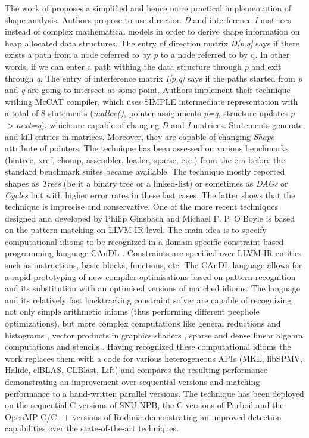\quad The work of \cite{Ghiya:1996:TDC:237721.237724} proposes a simplified and hence more practical implementation of shape analysis. Authors propose to use direction \textit{D} and interference \textit{I} matrices instead of complex mathematical models in order to derive shape information on heap allocated data structures. The entry of direction matrix \textit{D[p,q]} says if there exists a path from a node referred to by \textit{p} to a node referred to by q. In other words, if we can enter a path withing the data structure through \textit{p} and exit through \textit{q}. The entry of interference matrix \textit{I[p,q]} says if the paths started from \textit{p} and \textit{q} are going to intersect at some point. Authors implement their technique withing McCAT compiler, which uses SIMPLE intermediate representation with a total of 8 statements (\textit{malloc()}, pointer assignments \textit{p=q}, structure updates \textit{p-$>$next=q}), which are capable of changing \textit{D} and \textit{I} matrices. Statements generate and kill entries in matrices. Moreover, they are capable of changing \textit{Shape} attribute of pointers. The technique has been assessed on various benchmarks (bintree, xref, chomp, assembler, loader, sparse, etc.) from the era before the standard benchmark suites became available. The technique mostly reported shapes as \textit{Trees} (be it a binary tree or a linked-list) or sometimes as \textit{DAGs} or \textit{Cycles} but with higher error rates in these last cases. The latter shows that the technique is imprecise and conservative.\newline\null
\quad One of the more recent techniques designed and developed by Philip Ginsbach and Michael F. P. O’Boyle is based on the pattern matching on LLVM IR level. The main idea is to specify computational idioms to be recognized in a domain specific constraint based programming language CAnDL \cite{Ginsbach:2018:CDS:3178372.3179515}. Constraints are specified over LLVM IR entities such as instructions, basic blocks, functions, etc. The CAnDL language allows for a rapid prototyping of new compiler optimisations based on pattern recognition and its substitution with an optimised versions of matched idioms. The language and its relatively fast backtracking constraint solver are capable of recognizing not only simple arithmetic idioms (thus performing different peephole optimizations), but more complex computations like general reductions and histograms \cite{Ginsbach:2017:DEG:3049832.3049862}, vector products in graphics shaders \cite{Ginsbach:2018:AML:3296957.3173182}, sparse and dense linear algebra computations and stencils \cite{Ginsbach:2018:AML:3296957.3173182}. Having recognized these computational idioms the work \cite{Ginsbach:2018:AML:3296957.3173182} replaces them with a code for various heterogeneous APIs (MKL, libSPMV, Halide, clBLAS, CLBlast, Lift) and compares the resulting performance demonstrating an improvement over sequential versions and matching performance to a hand-written parallel versions. The technique has been deployed on the sequential C versions of SNU NPB, the C versions of Parboil and the OpenMP C/C++ versions of Rodinia demonstrating an improved detection capabilities over the state-of-the-art techniques.\newline\null
